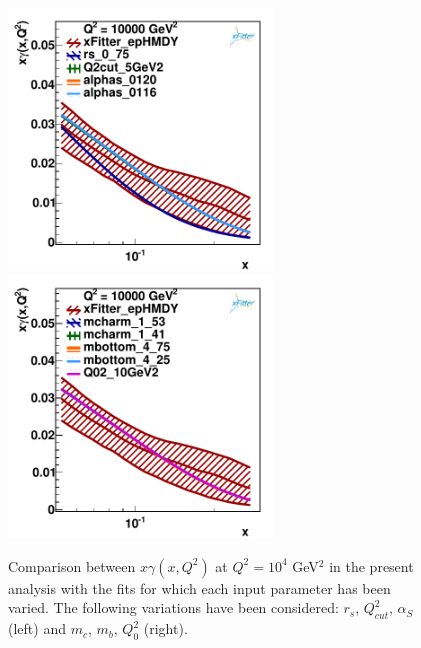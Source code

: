 \begin{figure}[h]
\centering
\includegraphics[width=7cm]{figs/q2_10000_pdf_ph_model_1}
\includegraphics[width=7cm]{figs/q2_10000_pdf_ph_model_2}
\caption{ Comparison between $x\gamma(x,Q^2)$ at $Q^2=10^4$ GeV$^2$ in the present
  analysis with the fits for which each input parameter has been varied.
 The following variations have been considered: $r_s$, $Q^2_{cut}$, $\alpha_S$ (left) and
$m_c$, $m_b$, $Q_0^2$ (right).
}
\label{fig:model}
\end{figure}

